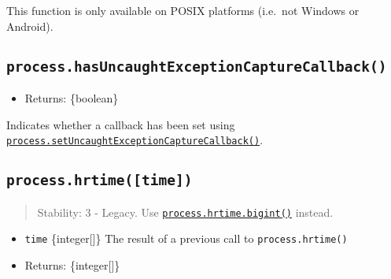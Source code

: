 \begin{Shaded}
\begin{Highlighting}[]
  \OperatorTok{=} \NormalTok{(}\NormalTok{)}\OperatorTok{;}

\NormalTok{ (}\NormalTok{) \{}
  \NormalTok{(}\SpecialCharTok{$\{}\NormalTok{()}\SpecialCharTok{\}}\VerbatimStringTok{\textasciigrave{}}\NormalTok{)}\OperatorTok{;}
\NormalTok{\}}
\end{Highlighting}
\end{Shaded}

This function is only available on POSIX platforms (i.e.~not Windows or
Android).

\subsection{\texorpdfstring{\texttt{process.hasUncaughtExceptionCaptureCallback()}}{process.hasUncaughtExceptionCaptureCallback()}}\label{process.hasuncaughtexceptioncapturecallback}

\begin{itemize}
\tightlist
\item
  Returns: \{boolean\}
\end{itemize}

Indicates whether a callback has been set using
\hyperref[processsetuncaughtexceptioncapturecallbackfn]{\texttt{process.setUncaughtExceptionCaptureCallback()}}.

\subsection{\texorpdfstring{\texttt{process.hrtime({[}time{]})}}{process.hrtime({[}time{]})}}\label{process.hrtimetime}

\begin{quote}
Stability: 3 - Legacy. Use
\hyperref[processhrtimebigint]{\texttt{process.hrtime.bigint()}}
instead.
\end{quote}

\begin{itemize}
\tightlist
\item
  \texttt{time} \{integer{[}{]}\} The result of a previous call to
  \texttt{process.hrtime()}
\item
  Returns: \{integer{[}{]}\}
\end{itemize}

